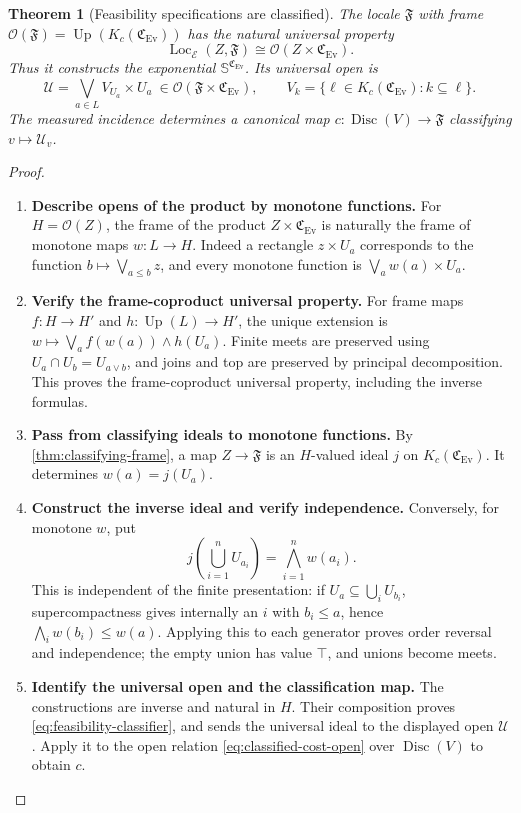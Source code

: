 \documentclass[11pt,a4paper]{article}
\numberwithin{algorithm}{section}
\numberwithin{equation}{section}
\newtheorem{theorem}{Theorem}[section]
\theoremstyle{definition}
\theoremstyle{remark}
\theoremstyle{plain}
\newcommand{\E}{\mathcal E}
\newcommand{\OO}{\mathcal O}
\newcommand{\Loc}{\operatorname{Loc}}
\newcommand{\Ev}{{\operatorname{Ev}}}
\newcommand{\Cplx}{\mathfrak C_{\Ev}}
\newcommand{\Up}{\operatorname{Up}}
\theoremstyle{definition}
\theoremstyle{plain}
\begin{document}
\begin{theorem}[Feasibility specifications are classified]
\label{thm:feasibility-classifier}
The locale $\mathfrak F$ with frame
$\OO(\mathfrak F)=\Up(K_c(\Cplx))$ has the natural universal
property
\begin{equation}\label{eq:feasibility-classifier}
 \Loc_\E(Z,\mathfrak F)\cong\OO(Z\times\Cplx).
\end{equation}
Thus it constructs the exponential $\mathbb S^{\Cplx}$.
Its universal open is
\[
 \mathscr U=\bigvee_{a\in L}V_{U_a}\times U_a
       \ \in\OO(\mathfrak F\times\Cplx),
 \qquad V_k=\{\ell\in K_c(\Cplx):k\subseteq\ell\}.
\]
The measured incidence determines a canonical map
$c:\operatorname{Disc}(V)\to\mathfrak F$ classifying
$v\mapsto\mathcal U_v$.
\end{theorem}
\begin{proof}\leavevmode
\begin{enumerate}[leftmargin=*,align=left]
\item \textbf{Describe opens of the product by monotone functions.}
For $H=\OO(Z)$, the frame of the product $Z\times\Cplx$
is naturally the frame of monotone maps $w:L\to H$.
Indeed a rectangle $z\times U_a$ corresponds to the function
$b\mapsto\bigvee_{a\le b}z$, and every monotone function is
$\bigvee_a w(a)\times U_a$.

\item \textbf{Verify the frame-coproduct universal property.}
For frame maps $f:H\to H'$ and
$h:\Up(L)\to H'$, the unique extension is
$w\mapsto\bigvee_a f(w(a))\wedge h(U_a)$.
Finite meets are preserved using $U_a\cap U_b=U_{a\vee b}$,
and joins and top are preserved by principal decomposition.
This proves the frame-coproduct universal property, including
the inverse formulas.

\item \textbf{Pass from classifying ideals to monotone functions.}
By \cref{thm:classifying-frame}, a map $Z\to\mathfrak F$
is an $H$-valued ideal $j$ on $K_c(\Cplx)$. It determines
$w(a)=j(U_a)$.

\item \textbf{Construct the inverse ideal and verify independence.}
Conversely, for monotone $w$, put
\[
 j\left(\bigcup_{i=1}^n U_{a_i}\right)
       =\bigwedge_{i=1}^n w(a_i).
\]
This is independent of the finite presentation: if
$U_a\subseteq\bigcup_iU_{b_i}$, supercompactness gives
internally an $i$ with $b_i\le a$, hence
$\bigwedge_iw(b_i)\le w(a)$. Applying this to each generator
proves order reversal and independence; the empty union has
value $\top$, and unions become meets.

\item \textbf{Identify the universal open and the classification map.}
The constructions are
inverse and natural in $H$. Their composition proves
\eqref{eq:feasibility-classifier}, and sends the universal ideal
to the displayed open $\mathscr U$.
Apply it to the open relation \eqref{eq:classified-cost-open}
over $\operatorname{Disc}(V)$ to obtain $c$.
\end{enumerate}
\end{proof}
\end{document}
